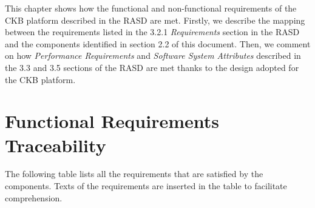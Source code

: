 This chapter shows how the functional and non-functional requirements of the CKB platform described in the RASD are met.
Firstly, we describe the mapping between the requirements listed in the 3.2.1 \textit{Requirements} section in the RASD
and the components identified in section 2.2 of this document.
Then, we comment on how \textit{Performance Requirements} and \textit{Software System Attributes} described in the 3.3
and 3.5 sections of the RASD are met thanks to the design adopted for the CKB platform.


\section{Functional Requirements Traceability}
\label{sec: functional_requirements_traceability}%
The following table lists all the requirements that are satisfied by the components.
Texts of the requirements are inserted in the table to facilitate comprehension.
